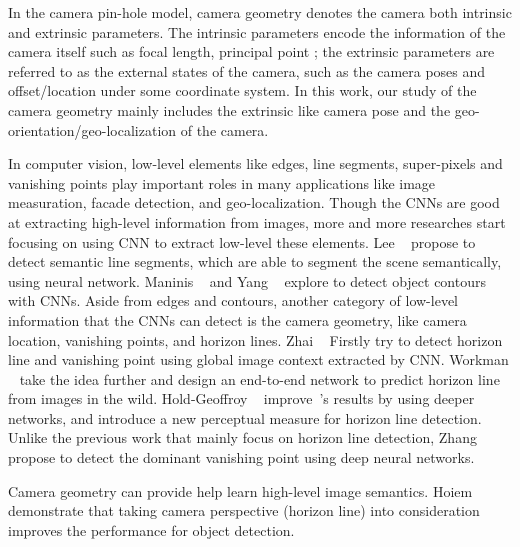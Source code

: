 In the camera pin-hole model, camera geometry denotes the camera
both intrinsic and extrinsic parameters. The intrinsic parameters
encode the information of the camera itself such as focal length,
principal point \etc; the extrinsic parameters are referred to as the
external states of the camera, such as the camera poses and
offset/location under some coordinate system. In this work, our study
of the camera geometry mainly includes the extrinsic like camera pose
and the geo-orientation/geo-localization of the camera.


In computer vision, low-level elements like edges, line segments,
super-pixels and vanishing points play important roles in many
applications like image measuration, facade detection, and
geo-localization.
Though the CNNs are good at extracting high-level information from
images, more and more researches start focusing on using CNN to
extract low-level these elements.
%
Lee \etal~\cite{lee2017semantic} propose to detect semantic line
segments, which are able to segment the scene semantically, using
neural network. Maninis \etal~\cite{maninis2016convolutional} and Yang
\etal~\cite{yang2016object} explore to detect object contours with
CNNs.
%
Aside from edges and contours, another category of low-level
information that the CNNs can detect is the camera geometry, like
camera location, vanishing points, and horizon lines.
Zhai \etal~\cite{zhai2016horizon} Firstly try to detect horizon
line and vanishing point using global image context extracted by CNN.
Workman \etal~\cite{workman2016horizon} take the idea further and
design an end-to-end network to predict horizon line from images
in the wild. 
Hold-Geoffroy \etal~\cite{hold2017perceptual}
improve~\cite{workman2016horizon}'s results by using deeper networks,
and introduce a new perceptual measure for horizon line detection.
Unlike the previous work that mainly focus on horizon line detection,
Zhang \etal~\cite{zhang2018dominant} propose to detect the dominant
vanishing point using deep neural networks.

Camera geometry can provide help learn high-level image semantics.
Hoiem \etal~\cite{hoiem2008putting} demonstrate that taking camera
perspective (horizon line) into consideration improves the performance
for object detection.

